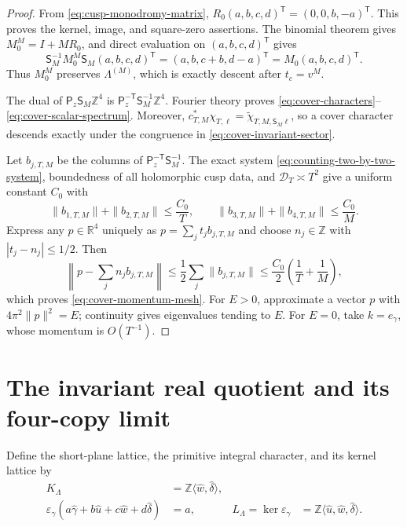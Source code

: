 \documentclass[11pt]{article}
\numberwithin{equation}{section}
\theoremstyle{definition}
\theoremstyle{remark}
\newcommand{\R}{\mathbb R}
\newcommand{\Z}{\mathbb Z}
\begin{document}
\begin{proof}
From \eqref{eq:cusp-monodromy-matrix},
$R_0(a,b,c,d)^{\mathsf T}=(0,0,b,-a)^{\mathsf T}$.  This proves the kernel,
image, and square-zero assertions.  The binomial theorem gives
$M_0^M=I+MR_0$, and direct evaluation on $(a,b,c,d)^{\mathsf T}$ gives
\[
 \mathsf S_M^{-1}M_0^M\mathsf S_M(a,b,c,d)^{\mathsf T}
 =(a,b,c+b,d-a)^{\mathsf T}=M_0(a,b,c,d)^{\mathsf T}.
\]
Thus $M_0^M$ preserves $\Lambda^{(M)}$, which is exactly descent after
$t_c=v^M$.

The dual of $\mathsf P_z\mathsf S_M\Z^4$ is
$\mathsf P_z^{-\mathsf T}\mathsf S_M^{-1}\Z^4$.  Fourier theory proves
\eqref{eq:cover-characters}--\eqref{eq:cover-scalar-spectrum}.  Moreover,
$c_{T,M}^*\chi_{T,\ell}=\widetilde\chi_{T,M,\mathsf S_M\ell}$, so a cover
character descends exactly under the congruence in
\eqref{eq:cover-invariant-sector}.

Let $b_{j,T,M}$ be the columns of
$\mathsf P_z^{-\mathsf T}\mathsf S_M^{-1}$.  The exact system
\eqref{eq:counting-two-by-two-system}, boundedness of all holomorphic cusp
data, and $\mathcal D_T\asymp T^2$ give a uniform constant $C_0$ with
\[
 \|b_{1,T,M}\|+\|b_{2,T,M}\|\le\frac{C_0}{T},
 \qquad
 \|b_{3,T,M}\|+\|b_{4,T,M}\|\le\frac{C_0}{M}.
\]
Express any $p\in\R^4$ uniquely as $p=\sum_jt_jb_{j,T,M}$ and choose
$n_j\in\Z$ with $|t_j-n_j|\le1/2$.  Then
\[
 \left\|p-\sum_jn_jb_{j,T,M}\right\|
 \le\frac12\sum_j\|b_{j,T,M}\|
 \le\frac{C_0}{2}\left(\frac1T+\frac1M\right),
\]
which proves \eqref{eq:cover-momentum-mesh}.  For $E>0$, approximate a
vector $p$ with $4\pi^2\|p\|^2=E$; continuity gives eigenvalues tending to
$E$.  For $E=0$, take $k=e_\gamma$, whose momentum is $O(T^{-1})$.
\end{proof}

\section{The invariant real quotient and its four-copy limit}

Define the short-plane lattice, the primitive integral character, and its
kernel lattice by
\begin{equation}\label{eq:invariant-character}
 \begin{aligned}
 K_\Lambda&=\Z\langle\widehat w,\widehat\delta\rangle,\\
 \varepsilon_\gamma
 (a\widehat\gamma+b\widehat u+c\widehat w+d\widehat\delta)&=a,
 &L_\Lambda=\ker\varepsilon_\gamma
 &=\Z\langle\widehat u,\widehat w,\widehat\delta\rangle.
 \end{aligned}
\end{equation}
\end{document}
